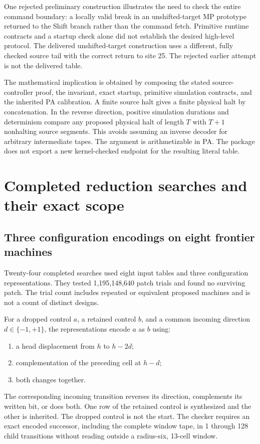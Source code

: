 \documentclass[11pt,letterpaper]{article}
\begin{document}
One rejected preliminary construction illustrates the need to check
the entire command boundary: a locally valid break in an unshifted-target
MP prototype returned to the Shift branch rather than the command fetch.
Primitive runtime contracts and a startup check alone did not establish
the desired high-level protocol. The delivered unshifted-target construction uses a different,
fully checked source tail with the correct return to site 25. The rejected
earlier attempt is not the delivered table.

The mathematical implication is obtained by composing the stated
source-controller proof, the invariant, exact startup, primitive simulation
contracts, and the inherited PA calibration. A finite source halt gives a
finite physical halt by concatenation. In the reverse direction, positive
simulation durations and determinism compare any proposed physical halt
of length $T$ with $T+1$ nonhalting source segments. This avoids assuming
an inverse decoder for arbitrary intermediate tapes. The argument is
arithmetizable in PA. The package does not export a new kernel-checked
endpoint for the resulting literal table.

\section{Completed reduction searches and their exact scope}
\label{sec:search}

\subsection{Three configuration encodings on eight frontier machines}

Twenty-four completed searches used eight input tables and three
configuration representations. They tested 1,195,148,640 patch trials
and found no surviving patch. The trial count includes repeated or
equivalent proposed machines and is not a count of distinct designs.

For a dropped control $a$, a retained control $b$, and a common incoming
direction $d\in\{-1,+1\}$, the representations encode $a$ as $b$ using:
\begin{enumerate}
\item a head displacement from $h$ to $h-2d$;
\item complementation of the preceding cell at $h-d$;
\item both changes together.
\end{enumerate}
The corresponding incoming transition reverses its direction, complements
its written bit, or does both. One row of the retained control is
synthesized and the other is inherited. The dropped control is not the
start. The checker requires an exact encoded successor, including the
complete window tape, in 1 through 128 child transitions without reading
outside a radius-six, 13-cell window.
\end{document}

